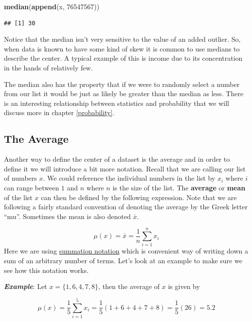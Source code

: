 \documentclass[]{book}
\newenvironment{Shaded}{\begin{snugshade}}{\end{snugshade}}
\newcommand{\DecValTok}[1]{\textcolor[rgb]{0.00,0.00,0.81}{#1}}
\newcommand{\KeywordTok}[1]{\textcolor[rgb]{0.13,0.29,0.53}{\textbf{#1}}}
\newcommand{\NormalTok}[1]{#1}
\begin{document}
\begin{Shaded}
\begin{Highlighting}[]
\KeywordTok{median}\NormalTok{(}\KeywordTok{append}\NormalTok{(x, }\DecValTok{76547567}\NormalTok{))}
\end{Highlighting}
\end{Shaded}

\begin{verbatim}
## [1] 30
\end{verbatim}

Notice that the median isn't very sensitive to the value of an added outlier. So, when data is known to have some kind of skew it is common to use medians to describe the center. A typical example of this is income due to its concentration in the hands of relatively few.

The median also has the property that if we were to randomly select a number from our list it would be just as likely be greater than the median as less. There is an interesting relationship between statistics and probability that we will discuss more in chapter \ref{probability}.

\hypertarget{the-average}{%
\subsection{The Average}\label{the-average}}

Another way to define the center of a dataset is the average and in order to define it we will introduce a bit more notation. Recall that we are calling our list of numbers \(x\). We could reference the individual numbers in the list by \(x_i\) where \(i\) can range between \(1\) and \(n\) where \(n\) is the size of the list. The \textbf{average} or \textbf{mean} of the list \(x\) can then be defined by the following expression. Note that we are following a fairly standard convention of denoting the average by the Greek letter ``mu''. Sometimes the mean is also denoted \(\bar{x}\).

\[\mu(x) = \bar{x} = \frac{1}{n} \sum_{i=1}^n x_i\]
Here we are using \href{https://en.wikipedia.org/wiki/Summation}{summation notation} which is convenient way of writing down a sum of an arbitrary number of terms. Let's look at an example to make sure we see how this notation works.

\emph{\textbf{Example}}: Let \(x = \{1, 6, 4, 7, 8\}\), then the average of \(x\) is given by

\[\mu(x) = \frac{1}{5} \sum_{i=1}^5 x_i = \frac{1}{5} (1 + 6 + 4 + 7 + 8) = \frac{1}{5} (26) = 5.2\]
\end{document}
